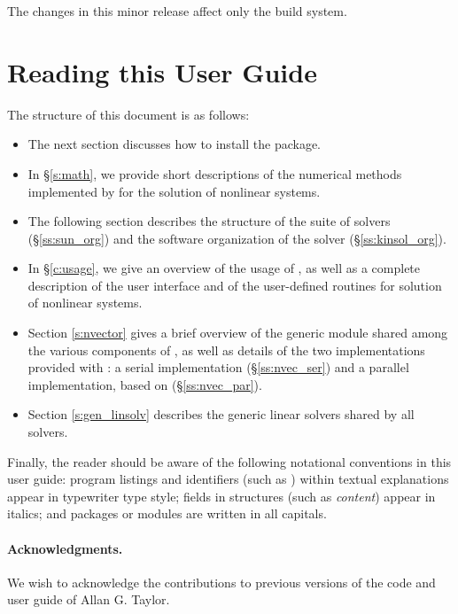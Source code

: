 The changes in this minor {\sundials} release affect only the build system.

\section{Reading this User Guide}\label{ss:reading}

The structure of this document is as follows:
\begin{itemize}
\item
  The next section discusses how to install the \kinsol package.
\item
  In \S\ref{s:math}, we provide short descriptions of the numerical
  methods implemented by {\kinsol} for the solution of nonlinear systems.
\item
  The following section describes the structure of the {\sundials} suite
  of solvers (\S\ref{ss:sun_org}) and the software organization of the {\kinsol}
  solver (\S\ref{ss:kinsol_org}).
\item
  In \S\ref{c:usage}, we give an overview of the usage of {\kinsol},
  as well as a complete description of the user interface and of the
  user-defined routines for solution of nonlinear systems.
\item
  Section \ref{s:nvector} gives a brief overview of the generic {\nvector} module
  shared among the various components of {\sundials}, as well as details of the two {\nvector}
  implementations provided with {\sundials}: a serial implementation
  (\S\ref{ss:nvec_ser}) and a parallel implementation, based on {\mpi} 
  (\S\ref{ss:nvec_par}).
\item
  Section \ref{s:gen_linsolv} describes the generic linear solvers shared
  by all {\sundials} solvers.
\end{itemize}

Finally, the reader should be aware of the following notational
conventions in this user guide:  program listings and identifiers
(such as ) within textual explanations appear in
typewriter type style; fields in {\C} structures (such as {\em
content}) appear in italics; and packages or modules are written
in all capitals.

\paragraph{Acknowledgments.}
We wish to acknowledge the contributions to previous versions of the
{\kinsol} code and user guide of Allan G. Taylor.
